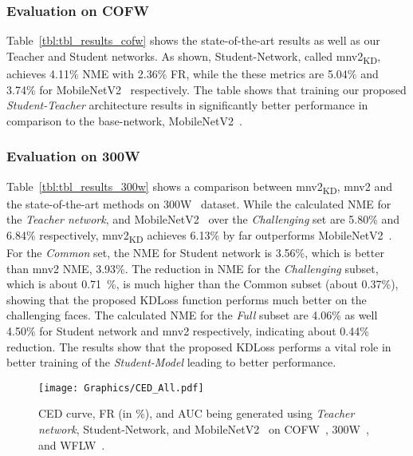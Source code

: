 \documentclass[times,twocolumn,final,authoryear]{elsarticle}
\begin{document}
\subsubsection{Evaluation on COFW}
Table~\ref{tbl:tbl_results_cofw} shows the state-of-the-art results as well as our Teacher and Student networks. As shown, Student-Network, called mnv2\textsubscript{KD}, achieves 4.11\% NME with 2.36\% FR, while the these metrics are 5.04\% and 3.74\% for MobileNetV2~\cite{sandler2018MobileNetV2} respectively. The table shows that training our proposed \textit{Student-Teacher} architecture results in significantly better performance in comparison to the base-network, MobileNetV2~\cite{sandler2018MobileNetV2}. 

\subsubsection{Evaluation on 300W}
Table~\ref{tbl:tbl_results_300w} shows a comparison between mnv2\textsubscript{KD}, mnv2 and the state-of-the-art methods on 300W~\cite{sagonas2013300} dataset. While the calculated NME for the \textit{Teacher network}, and MobileNetV2~\cite{sandler2018MobileNetV2} over the \textit{Challenging} set are 5.80\% and 6.84\% respectively, mnv2\textsubscript{KD} achieves 6.13\% by far outperforms MobileNetV2~\cite{sandler2018MobileNetV2}. For the \textit{Common} set, the NME for Student network is 3.56\%, which is better than mnv2 NME, 3.93\%. The reduction in NME for the \textit{Challenging} subset, which is about 0.71~\%, is much higher than the Common subset (about 0.37\%), showing that the proposed KDLoss function performs much better on the challenging faces. The calculated NME for the \textit{Full} subset are 4.06\% as well 4.50\% for Student network and mnv2 respectively, indicating about 0.44\% reduction. The results show that the proposed KDLoss performs a vital role in better training of the \textit{Student-Model} leading to better performance.

\begin{figure*}[t]
  \centering
  \texttt{[image: Graphics/CED\_All.pdf]}
  \caption{CED curve, FR (in \%), and AUC  being generated using \textit{Teacher network}, Student-Network, and MobileNetV2~\cite{sandler2018MobileNetV2} on COFW~\cite{burgos2013robust}, 300W~\cite{sagonas2013300}, and WFLW~\cite{wu2018look}.}
  \label{fig:CED_all}
\end{figure*}
\end{document}
